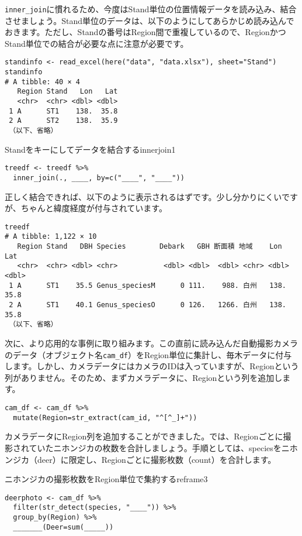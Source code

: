 \verb|inner_join|に慣れるため、今度はStand単位の位置情報データを読み込み、結合させましょう。Stand単位のデータは、以下のようにしてあらかじめ読み込んでおきます。ただし、Standの番号はRegion間で重複しているので、RegionかつStand単位での結合が必要な点に注意が必要です。
\begin{verbatim}
standinfo <- read_excel(here("data", "data.xlsx"), sheet="Stand")
standinfo
# A tibble: 40 × 4
   Region Stand   Lon   Lat
   <chr>  <chr> <dbl> <dbl>
 1 A      ST1    138.  35.8
 2 A      ST2    138.  35.9
 （以下、省略）
\end{verbatim}

\begin{exercise}{Standをキーにしてデータを結合する}{innerjoin1}
\begin{verbatim}
treedf <- treedf %>%
  inner_join(., ____, by=c("____", "____"))
\end{verbatim}
\end{exercise}

正しく結合できれば、以下のように表示されるはずです。少し分かりにくいですが、ちゃんと緯度経度が付与されています。
\begin{verbatim}
treedf
# A tibble: 1,122 × 10
   Region Stand   DBH Species        Debark   GBH 断面積 地域    Lon   Lat
   <chr>  <chr> <dbl> <chr>           <dbl> <dbl>  <dbl> <chr> <dbl> <dbl>
 1 A      ST1    35.5 Genus_speciesM      0 111.    988. 白州   138.  35.8
 2 A      ST1    40.1 Genus_speciesO      0 126.   1266. 白州   138.  35.8
 （以下、省略）
 \end{verbatim}

次に、より応用的な事例に取り組みます。この直前に読み込んだ自動撮影カメラのデータ（オブジェクト名\verb|cam_df|）をRegion単位に集計し、毎木データに付与します。しかし、カメラデータにはカメラのIDは入っていますが、Regionという列がありません。そのため、まずカメラデータに、Regionという列を追加します。
\begin{verbatim}
cam_df <- cam_df %>%
  mutate(Region=str_extract(cam_id, "^[^_]+"))
\end{verbatim}

カメラデータにRegion列を追加することができました。では、Regionごとに撮影されていたニホンジカの枚数を合計しましょう。手順としては、speciesをニホンジカ（deer）に限定し、Regionごとに撮影枚数（count）を合計します。

\begin{exercise}{ニホンジカの撮影枚数をRegion単位で集約する}{reframe3}
\begin{verbatim}
deerphoto <- cam_df %>%
  filter(str_detect(species, "____")) %>%
  group_by(Region) %>%
  _______(Deer=sum(_____))
\end{verbatim}
\end{exercise}

